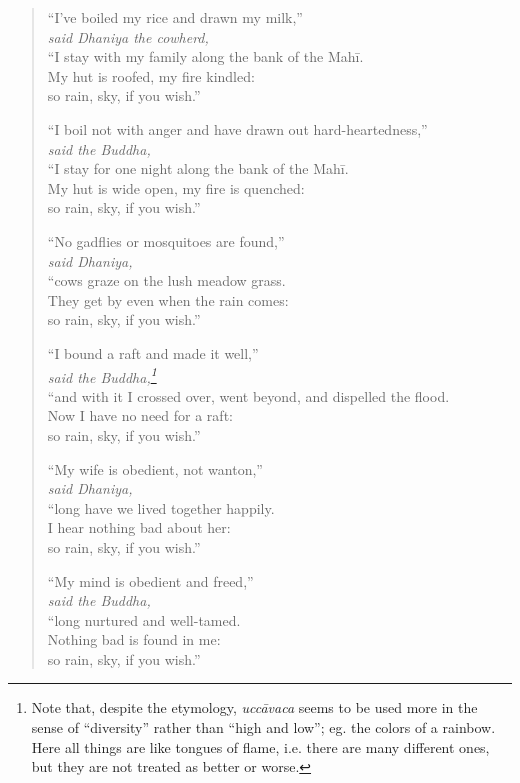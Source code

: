 \documentclass[12pt,openany]{book}%
\newcommand*{\scspeaker}[1]{\hspace{2em}\textit{#1}}
\begin{document}
\begin{verse}%
“I’ve boiled my rice and drawn my milk,” \\
\scspeaker{said Dhaniya the cowherd, }\\
“I stay with my family along the bank of the \textsanskrit{Mahī}. \\
My hut is roofed, my fire kindled: \\
so rain, sky, if you wish.” 

“I boil not with anger and have drawn out hard-heartedness,” \\
\scspeaker{said the Buddha, }\\
“I stay for one night along the bank of the \textsanskrit{Mahī}. \\
My hut is wide open, my fire is quenched: \\
so rain, sky, if you wish.” 

“No gadflies or mosquitoes are found,” \\
\scspeaker{said Dhaniya, }\\
“cows graze on the lush meadow grass. \\
They get by even when the rain comes: \\
so rain, sky, if you wish.” 

“I bound a raft and made it well,” \\
\scspeaker{said the Buddha,\footnote{Note that, despite the etymology, \textit{\textsanskrit{uccāvaca}} seems to be used more in the sense of “diversity” rather than “high and low”; eg. the colors of a rainbow. Here all things are like tongues of flame, i.e. there are many different ones, but they are not treated as better or worse. } }\\
“and with it I crossed over, went beyond, and dispelled the flood. \\
Now I have no need for a raft: \\
so rain, sky, if you wish.” 

“My wife is obedient, not wanton,” \\
\scspeaker{said Dhaniya, }\\
“long have we lived together happily. \\
I hear nothing bad about her: \\
so rain, sky, if you wish.” 

“My mind is obedient and freed,” \\
\scspeaker{said the Buddha, }\\
“long nurtured and well-tamed. \\
Nothing bad is found in me: \\
so rain, sky, if you wish.” 


\end{verse}
\end{document}
